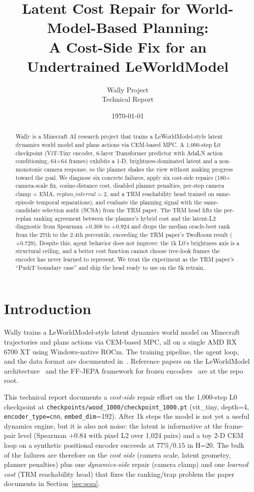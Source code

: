 \documentclass[11pt]{article}
\title{Latent Cost Repair for World-Model-Based Planning:\\A Cost-Side Fix for an Undertrained LeWorldModel}
\author{Wally Project\\Technical Report}
\date{\today}
\begin{document}
\maketitle

\begin{abstract}
\noindent
Wally is a Minecraft AI research project that trains a LeWorldModel-style
latent dynamics world model and plans actions via CEM-based MPC. A
1{,}000-step L0 checkpoint (ViT-Tiny encoder, 6-layer Transformer
predictor with AdaLN action conditioning, 64$\times$64 frames)
exhibits a 1-D, brightness-dominated latent and a non-monotonic camera
response, so the planner shakes the view without making progress
toward the goal. We diagnose six concrete failures, apply six
cost-side repairs (180$\times$ camera-scale fix, cosine-distance cost,
disabled planner penalties, per-step camera clamp + EMA,
$replan\_interval = 2$, and a TRM reachability head trained on
same-episode temporal separations), and evaluate the planning signal
with the same-candidate selection audit (SCSA) from the TRM paper.
The TRM head lifts the per-replan ranking agreement between the
planner's hybrid cost and the latent-L2 diagnostic from
Spearman $+0.308$ to $+0.924$ and drops the median oracle-best rank
from the 27th to the 2.4th percentile, exceeding the TRM paper's
TwoRoom result ($+0.729$). Despite this, agent behavior does not
improve: the 1k L0's brightness axis is a structural ceiling, and a
better cost function cannot choose tree-look frames the encoder has
never learned to represent. We treat the experiment as the TRM
paper's ``PushT boundary case'' and ship the head ready to use on
the 5k retrain.
\end{abstract}

\section{Introduction}
\label{sec:intro}

Wally trains a LeWorldModel-style latent dynamics world model on
Minecraft trajectories and plans actions via CEM-based MPC, all on a
single AMD RX 6700 XT using Windows-native ROCm. The training
pipeline, the agent loop, and the data format are documented
in~\cite{wally:ag, wally:root}. Reference papers on the LeWorldModel
architecture~\cite{lewm} and the FF-JEPA framework for frozen
encoders~\cite{ffjepa} are at the repo root.

This technical report documents a \emph{cost-side} repair effort on
the 1{,}000-step L0 checkpoint at
\texttt{checkpoints/wood\_1000/checkpoint\_1000.pt} (vit\_tiny,
depth=4, \texttt{encoder\_type=cnn}, \texttt{embed\_dim}=192). After
1k steps the model is not yet a useful dynamics engine, but it is
also not noise: the latent is informative at the frame-pair level
(Spearman $+0.84$ with pixel L2 over 1{,}024 pairs) and a toy
2-D CEM loop on a synthetic positional encoder succeeds at
$77\% / 0.15$ in H=20. The bulk of the failures are therefore on the
\emph{cost side} (camera scale, latent geometry, planner penalties)
plus one \emph{dynamics-side} repair (camera clamp) and one
\emph{learned cost} (TRM reachability head) that fixes the
ranking/trap problem the paper documents in Section~\ref{sec:scsa}.
\end{document}
